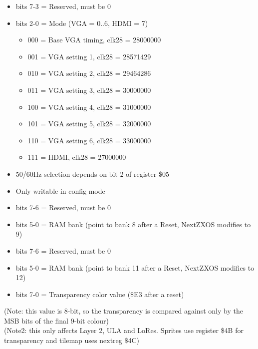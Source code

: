 \begin{itemize}
\item bits 7-3 = Reserved, must be 0
\item bits 2-0 = Mode (VGA = 0..6, HDMI = 7)
  \begin{itemize}
  \item 000 = Base VGA timing, clk28 = 28000000
  \item 001 = VGA setting 1, clk28 = 28571429
  \item 010 = VGA setting 2, clk28 = 29464286
  \item 011 = VGA setting 3, clk28 = 30000000
  \item 100 = VGA setting 4, clk28 = 31000000
  \item 101 = VGA setting 5, clk28 = 32000000
  \item 110 = VGA setting 6, clk28 = 33000000
  \item 111 = HDMI, clk28 = 27000000
  \end{itemize}
\item[] 50/60Hz selection depends on bit 2 of register \$05
\item[] Only writable in config mode
\end{itemize}

\begin{itemize}
\item bits 7-6 = Reserved, must be 0
\item bits 5-0 = RAM bank (point to bank 8 after a Reset, NextZXOS
  modifies to 9)
\end{itemize}

\begin{itemize}
\item bits 7-6 = Reserved, must be 0
\item bits 5-0 = RAM bank (point to bank 11 after a Reset, NextZXOS
  modifies to 12)
\end{itemize}

\begin{itemize}
\item bits 7-0 = Transparency color value (\$E3 after a reset)
\end{itemize}
(Note: this value is 8-bit, so the transparency is compared against
only by the MSB bits of the final 9-bit colour)\\
(Note2: this only affects Layer 2, ULA and LoRes. Sprites use register
\$4B for transparency and tilemap uses nextreg \$4C)

